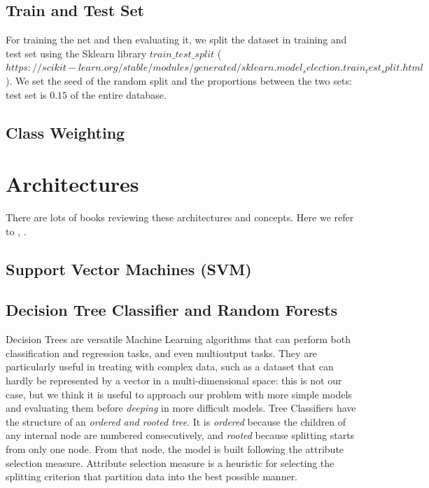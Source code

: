 \documentclass{article}
\begin{document}
\subsection{Train and Test Set}

For training the net and then evaluating it, we split the dataset in training and test set using the Sklearn library $train\_test\_split$ ($https://scikit-learn.org/stable/modules/generated/sklearn.model_selection.train_test_split.html$). We set the seed of the random split and the proportions between the two sets: test set is $0.15$ of the entire database.

\subsection{Class Weighting}




\section{Architectures}
There are lots of books reviewing these architectures and concepts. Here we refer to \cite{geron2017hands} , \cite{bishop2006pattern}
\cite{hertz1991introduction}.

\subsection{Support Vector Machines (SVM)}

\subsection{Decision Tree Classifier and Random Forests}

Decision Trees are versatile Machine Learning algorithms that can perform both classification and regression tasks, and even multioutput tasks. They are particularly useful in treating with complex data, such as a dataset that can hardly be represented by a vector in a multi-dimensional space: this is not our case, but we think it is useful to approach our problem with more simple models and evaluating them before \textit{deeping} in more difficult models.
Tree Classifiers have the structure of an \textit{ordered and rooted tree}. It is \textit{ordered} because the children of any internal node are numbered consecutively, and \textit{rooted} because splitting starts from only one node.
From that node, the model is built following the attribute selection measure.
Attribute selection measure is a heuristic for selecting the splitting criterion that partition data into the best possible manner.
\end{document}
